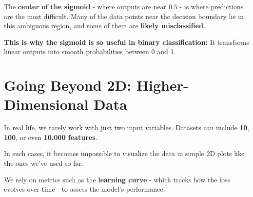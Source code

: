 \documentclass[11pt]{article}
\begin{document}
\vspace{0.5em}

\noindent The \textbf{center of the sigmoid} - where outputs are near $0.5$ - is where predictions are the most difficult.  
Many of the data points near the decision boundary lie in this ambiguous region, and some of them are \textbf{likely misclassified}.

\vspace{1em}

\begin{tcolorbox}[colback=white!98!gray, colframe=gray!30!black, arc=1mm]
\textbf{This is why the sigmoid is so useful in binary classification:}  
It transforms linear outputs into smooth probabilities between 0 and 1.
\end{tcolorbox}

\vspace{1em}

\begin{center}
\end{center}

\newpage

\section*{Going Beyond 2D: Higher-Dimensional Data}

\vspace{0.5em}

In real life, we rarely work with just two input variables.  
Datasets can include \textbf{10}, \textbf{100}, or even \textbf{10,000 features}.

\vspace{0.5em}

\noindent In such cases, it becomes impossible to visualize the data in simple 2D plots like the ones we've used so far.

\vspace{1em}

\begin{tcolorbox}[colback=gray!5, colframe=black!50, title=So how do we evaluate the model?, fonttitle=\bfseries, arc=2mm]
We rely on metrics such as the \textbf{learning curve} -  
which tracks how the loss evolves over time - to assess the model's performance.
\end{tcolorbox}

\vspace{1em}
\end{document}
